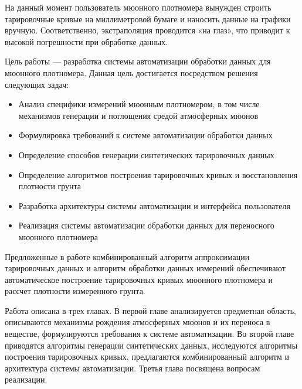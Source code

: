 На данный момент пользователь мюонного плотномера вынужден строить тарировочные кривые на миллиметровой бумаге 
и наносить данные на графики вручную. Соответственно, экстраполяция проводится «на глаз», что приводит к высокой 
погрешности при обработке данных.


Цель работы --- разработка системы автоматизации обработки данных для мюонного плотномера. 
Данная цель достигается посредством решения следующих задач:

\begin{itemize}
 \item Анализ специфики измерений мюонным плотномером, в том числе механизмов генерации и поглощения средой атмосферных мюонов
 \item Формулировка требований к системе автоматизации обработки данных
 \item Определение способов генерации синтетических тарировочных данных 
 \item Определение алгоритмов построения тарировочных кривых и  восстановления плотности грунта
 \item Разработка архитектуры системы автоматизации и интерфейса пользователя
 \item Реализация системы автоматизации обработки данных для переносного мюонного плотномера
\end{itemize}

Предложенные в работе комбинированный алгоритм аппроксимации тарировочных данных и алгоритм обработки данных измерений
обеспечивают автоматическое построение тарировочных кривых мюонного плотномера и рассчет плотности измеренного грунта.

Работа описана в трех главах. В первой главе анализируется предметная область, описываются механизмы рождения атмосферных мюонов и их переноса в веществе, формулируются требования к системе автоматизации. Во второй главе
приводятся алгоритмы генерации синтетических данных, исследуются  алгоритмы построения тарировочных кривых, предлагаются комбинированный алгоритм и архитектура системы автоматизации. Третья глава посвящена вопросам реализации. 

\clearpage